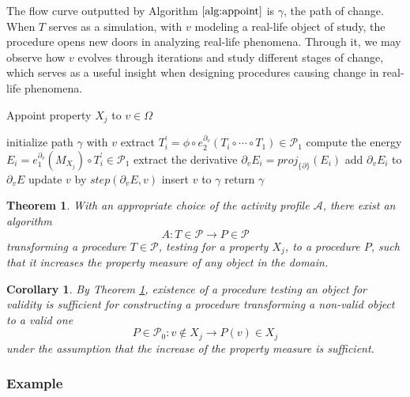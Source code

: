 \documentclass{article}
\newcommand{\dP}{\mathcal{P}}
\newcommand{\D}{\partial}
\newtheorem{izrek}{Theorem}[section]
\newtheorem{corollary}{Corollary}[section]
\begin{document}
    The flow curve outputted by Algorithm $\ref{alg:appoint}$ is $\gamma$, the path of change. When $T$ serves as a simulation, with $v$ modeling a real-life object of study, the procedure opens new doors in analyzing real-life phenomena. Through it, we may observe how $v$ evolves through iterations and study different stages of change, which serves as a useful insight when designing procedures causing change in real-life phenomena.
   
   \begin{algorithm}[H]
   \caption{Appoint property $X_j$ to $v\in \Omega$}
   \label{alg:appoint}
   \begin{algorithmic}[1]
   \State initialize path $\gamma$ with $v$
   \State extract $T^\prime_i=\phi\circ e^{\D_{v}}_2(T_i\circ\cdots\circ T_1)\in\dP_1$
   \State compute the energy $E_i=e^{\D_v}_1(M_{X_j})\circ T^\prime_i\in\dP_1$
   \State extract the derivative $\D_v E_i=proj_{\{\D\}}(E_i)$
   \State add $\D_v E_i$ to $\D_v E$
   \EndFor
   \State update $v$ by $step(\D_v E,v)$
   \State insert $v$ to $\gamma$
   \EndFor
   \State return $\gamma$
   \EndProcedure
   \end{algorithmic}
   \end{algorithm}
   

   \begin{izrek}\label{izr:algA}
        With an appropriate choice of the activity profile $\mathcal{A}$, there exist an algorithm
        \begin{equation}\label{eq:algA}
          A:T\in\dP\to P\in\dP
          \end{equation}
          transforming a procedure $T\in\dP$, testing for a property $X_j$, to a procedure $P$, such that it increases the property measure of any object in the domain. 
        \end{izrek}
        \begin{corollary}
           By Theorem \ref{izr:algA}, existence of a procedure testing an object for validity is sufficient for constructing a procedure transforming a non-valid object to a valid one
           $$P\in \dP_0:v\notin X_j\to P(v)\in X_j$$
           under the assumption that the increase of the property measure is sufficient.
           \end{corollary}
   
   \subsubsection{Example}
   
\end{document}
